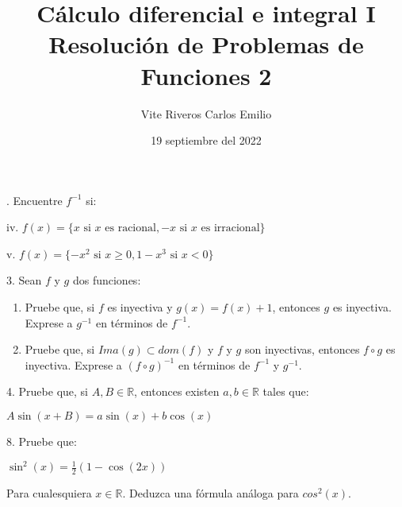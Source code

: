 \documentclass[11pt, a4paper]{article}
\title{Cálculo diferencial e integral I\\Resolución de Problemas de Funciones 2}
\author{Vite Riveros Carlos Emilio}
\date{19 septiembre del 2022}
\begin{document}
    . Encuentre $f^{-1}$ si:
    \begin{center}
        iv. $f(x)=\{x \text{ si $x$ es racional}, -x \text{ si $x$ es irracional}\} $

        v. $f(x)=\{-x^2 \text{ si $x\geq 0$}, 1-x^3 \text{ si $x<0$}\}$
    \end{center}
    3. Sean $f$ y $g$ dos funciones:
    \begin{center}
        \begin{enumerate}[label= \roman*]
            \item Pruebe que, si $f$ es inyectiva y $g(x)=f(x)+1$, entonces $g$ es inyectiva. Exprese a $g^{-1}$ en 
            términos de $f^{-1}$.

            \item Pruebe que, si $Ima(g) \subset dom(f)$ y $f$ y $g$ son inyectivas, entonces $f \circ g$ es inyectiva. 
            Exprese a $(f \circ g)^{-1}$ en términos de $f^{-1}$ y $g^{-1}$.

        \end{enumerate}
    \end{center}
    4. Pruebe que, si $A, B \in \mathbb{R}$, entonces existen $a,b \in \mathbb{R}$ tales que:
    \begin{center}
        $A\sin{(x+B)}=a\sin{(x)}+b\cos{(x)}$
    \end{center}
    8. Pruebe que:
    \begin{center}
        $\sin^2(x)=\frac{1}{2}(1-\cos (2x))$
    \end{center}
    Para cualesquiera $x \in \mathbb{R}$. Deduzca una fórmula análoga para $cos^2 (x)$.
\end{document}
